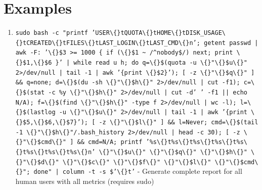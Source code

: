 \documentclass{article}
\begin{document}
\section*{Examples}
\begin{enumerate}
  \item \texttt{sudo bash -c "printf 'USER\textbackslash\{\}tQUOTA\textbackslash\{\}tHOME\textbackslash\{\}tDISK\_USAGE\textbackslash\{\}tCREATED\textbackslash\{\}tFILES\textbackslash\{\}tLAST\_LOGIN\textbackslash\{\}tLAST\_CMD\textbackslash\{\}n'; getent passwd | awk -F: '\textbackslash\{\}\$3 >= 1000 \{ if (\textbackslash\{\}\$1 \textasciitilde{} /\textasciicircum{}nobody\$/) next; print \textbackslash\{\}\$1,\textbackslash\{\}\$6 \}' | while read u h; do q=\textbackslash\{\}\$(quota -u \textbackslash\{\}"\textbackslash\{\}\$u\textbackslash\{\}" 2>/dev/null | tail -1 | awk '\{print \textbackslash\{\}\$2\}'); [ -z \textbackslash\{\}"\textbackslash\{\}\$q\textbackslash\{\}" ] \&\& q=none; d=\textbackslash\{\}\$(du -sh \textbackslash\{\}"\textbackslash\{\}\$h\textbackslash\{\}" 2>/dev/null | cut -f1); c=\textbackslash\{\}\$(stat -c \%y \textbackslash\{\}"\textbackslash\{\}\$h\textbackslash\{\}" 2>/dev/null | cut -d' ' -f1 || echo N/A); f=\textbackslash\{\}\$(find \textbackslash\{\}"\textbackslash\{\}\$h\textbackslash\{\}" -type f 2>/dev/null | wc -l); l=\textbackslash\{\}\$(lastlog -u \textbackslash\{\}"\textbackslash\{\}\$u\textbackslash\{\}" 2>/dev/null | tail -1 | awk '\{print \textbackslash\{\}\$5,\textbackslash\{\}\$6,\textbackslash\{\}\$7\}'); [ -z \textbackslash\{\}"\textbackslash\{\}\$l\textbackslash\{\}" ] \&\& l=Never; cmd=\textbackslash\{\}\$(tail -1 \textbackslash\{\}"\textbackslash\{\}\$h\textbackslash\{\}"/.bash\_history 2>/dev/null | head -c 30); [ -z \textbackslash\{\}"\textbackslash\{\}\$cmd\textbackslash\{\}" ] \&\& cmd=N/A; printf '\%s\textbackslash\{\}t\%s\textbackslash\{\}t\%s\textbackslash\{\}t\%s\textbackslash\{\}t\%s\textbackslash\{\}t\%s\textbackslash\{\}t\%s\textbackslash\{\}t\%s\textbackslash\{\}n' \textbackslash\{\}"\textbackslash\{\}\$u\textbackslash\{\}" \textbackslash\{\}"\textbackslash\{\}\$q\textbackslash\{\}" \textbackslash\{\}"\textbackslash\{\}\$h\textbackslash\{\}" \textbackslash\{\}"\textbackslash\{\}\$d\textbackslash\{\}" \textbackslash\{\}"\textbackslash\{\}\$c\textbackslash\{\}" \textbackslash\{\}"\textbackslash\{\}\$f\textbackslash\{\}" \textbackslash\{\}"\textbackslash\{\}\$l\textbackslash\{\}" \textbackslash\{\}"\textbackslash\{\}\$cmd\textbackslash\{\}"; done" | column -t -s \$'\textbackslash\{\}t'} - Generate complete report for all human users with all metrics (requires sudo)

\end{enumerate}
\end{document}
